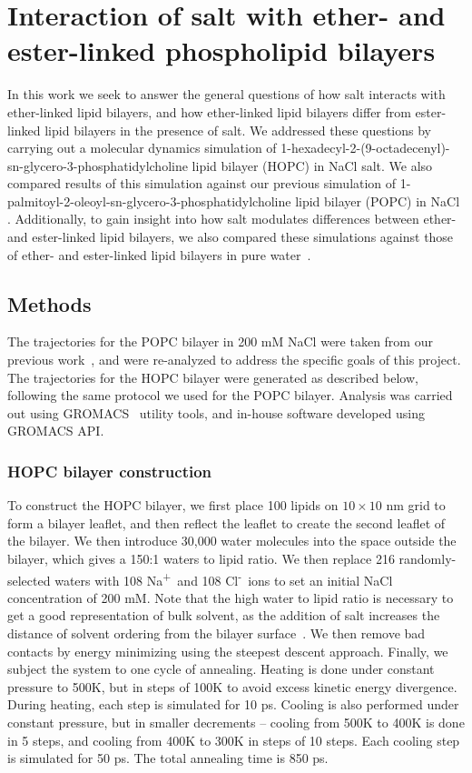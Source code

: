 \documentclass[12pt,openany,final]{book}
\newcommand{\na}{Na\textsuperscript{+}~}
\newcommand{\cl}{Cl\textsuperscript{-}~}
\begin{document}
\chapter{Interaction of salt with ether- and ester-linked phospholipid bilayers}
In this work we seek to answer the general questions of how salt inte\-racts 
with ether-linked lipid bilayers, and how ether-linked lipid bilayers differ from ester-linked lipid bilayers in the presence of salt.
We addressed these questions by carrying out a molecular dynamics simulation of 
1-hexadecyl-2-(9-octadecenyl)-sn-glycero-3-phosphatidylcholine lipid bilayer (HOPC) in NaCl salt. 
We also compared results of this simulation against our previous simulation of 
1-palmitoyl-2-oleoyl-sn-glycero-3-phosphatidylcholine lipid bilayer (POPC) 
in NaCl \cite{kruczek:2017}. Additionally, to gain insight into how salt modulates differences between ether- 
and ester-linked lipid bilayers, we also compared these simulations against those of ether- and ester-linked lipid bilayers in pure water~\cite{kruczek:2017:ether}. 
\section{Methods}
The trajectories for the POPC bilayer in 200 mM NaCl were taken from our previous work~\cite{kruczek:2017}, 
and were re-analyzed to address the specific goals of this project. The trajectories
for the HOPC bilayer were generated as described below, following the same protocol we used for the POPC bilayer. 
Analysis was carried out using GROMACS~\cite{abraham:2015,pall:2014,van:2005,lindahl:2001,berendsen:1995} utility 
tools, and in-house software developed using GROMACS API.

\subsection{HOPC bilayer construction}
To construct the HOPC bilayer, we first place 100 lipids on $10 \times 10$ nm grid to form a bilayer leaflet, and then reflect the leaflet to 
create the second leaflet of the bilayer. We then introduce 30,000 water molecules into the space outside the bilayer, which gives a
 150:1 waters to lipid ratio. We then replace 216 randomly-selected waters with 108 \na and 108 \cl ions to set an initial 
NaCl concentration of 200 mM. Note that the high water to lipid ratio is necessary to get a good representation of bulk solvent, 
as the addition of salt increases the distance of solvent ordering from the bilayer surface~\cite{kruczek:2017}. We then 
remove bad contacts by energy minimizing using the steepest descent approach. Finally, we subject the system to one cycle of annealing. Heating 
is done under constant pressure to 500K, but in steps of 100K to avoid excess kinetic energy divergence. During heating, each step is simulated 
for 10 ps. Cooling is also performed under constant pressure, but in smaller decrements -- cooling from 500K to 
400K is done in 5 steps, and cooling from 400K to 300K in steps of 10 steps. Each cooling step is simulated for 50 ps. The total annealing time is 850 ps.
\end{document}
